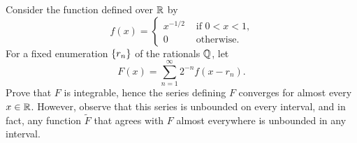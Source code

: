 \begin{exercise}
    Consider the function defined over $\mathbb{R}$ by 
    \begin{equation*}
        f(x) = \begin{cases}
            x^{-1/2} & \text{ if $0<x<1$,} \\
            0 & \text{ otherwise.}
        \end{cases}
    \end{equation*}
    For a fixed enumeration $\left\{ {r_n} \right\}$ of the rationals $\mathbb{Q}$, let 
    \begin{equation*}
        F(x) = \sum_{n=1}^{\infty} 2^{-n}f(x-r_n).
    \end{equation*}
    Prove that $F$ is integrable, hence the series defining $F$ converges 
    for almost every $x\in\mathbb{R}$. However, observe that this series is 
    unbounded on every interval, and in fact, any function $\tilde{F}$ 
    that agrees with $F$ almost everywhere is unbounded in any interval.
\end{exercise}